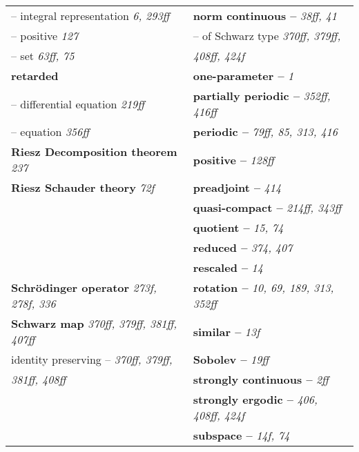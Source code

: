 \begin{longtable}{p{}p{}}
\quad -- integral representation \textit{6, 293ff} & \textbf{norm continuous --} \textit{38ff, 41} \\
\quad -- positive \textit{127} & \quad -- of Schwarz type \textit{370ff, 379ff,} \\
\quad -- set \textit{63ff, 75} & \quad\quad \textit{408ff, 424f} \\
\textbf{retarded} & \textbf{one-parameter --} \textit{1} \\
\quad -- differential equation \textit{219ff} & \textbf{partially periodic --} \textit{352ff, 416ff} \\
\quad -- equation \textit{356ff} & \textbf{periodic --} \textit{79ff, 85, 313, 416} \\
\textbf{Riesz Decomposition theorem} \textit{237} & \textbf{positive --} \textit{128ff} \\
\textbf{Riesz Schauder theory} \textit{72f} & \textbf{preadjoint --} \textit{414} \\
& \textbf{quasi-compact --} \textit{214ff, 343ff} \\
& \textbf{quotient --} \textit{15, 74} \\
& \textbf{reduced --} \textit{374, 407} \\
& \textbf{rescaled --} \textit{14} \\
\textbf{Schrödinger operator} \textit{273f, 278f, 336} & \textbf{rotation --} \textit{10, 69, 189, 313, 352ff} \\
\textbf{Schwarz map} \textit{370ff, 379ff, 381ff, 407ff} & \textbf{similar --} \textit{13f} \\
\quad identity preserving -- \textit{370ff, 379ff,} & \textbf{Sobolev --} \textit{19ff} \\
\quad\quad \textit{381ff, 408ff} & \textbf{strongly continuous --} \textit{2ff} \\
& \textbf{strongly ergodic --} \textit{406, 408ff, 424f} \\
& \textbf{subspace --} \textit{14f, 74} \\


\end{longtable}
